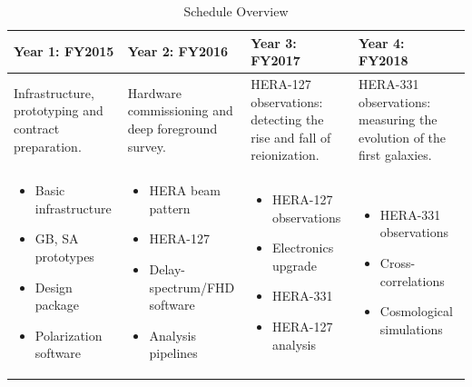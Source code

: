 \documentclass[preprint]{aastex}
\begin{document}
\begin{table}[h]
\centering
\caption{Schedule Overview}
\label{tab:scheduleSummary}
\begin{tabular}{| p{1.5in} | p{1.5in} | p{1.5in} | p{1.5in} |}\hline
\textbf{Year 1}:  FY2015   &  \textbf{Year 2}:  FY2016  &  \textbf{Year 3}:  FY2017 & \textbf{Year 4}:  FY2018 \\ \hline
\raggedright{Infrastructure, prototyping and contract preparation.} &
\raggedright{Hardware commissioning and deep foreground survey.} &
\raggedright{HERA-127 observations:  detecting the rise and fall of reionization.} &
HERA-331 observations:  measuring the evolution of the first galaxies. \\ \hline  %
\begin{itemize}[noitemsep,nolistsep,leftmargin=12pt]
\item Basic infrastructure
\item GB, SA prototypes
\item Design package
\item Polarization software
\end{itemize} &
\begin{itemize}[noitemsep,nolistsep,leftmargin=12pt]
\item HERA beam pattern
\item HERA-127
\item Delay-spectrum/FHD software
\item Analysis pipelines
\end{itemize} &
\begin{itemize}[noitemsep,nolistsep,leftmargin=12pt]
\item HERA-127 observations
\item Electronics upgrade
\item HERA-331
\item HERA-127 analysis
\end{itemize} &
\begin{itemize}[noitemsep,nolistsep,leftmargin=12pt]
\item HERA-331 observations
\item Cross-correlations
\item Cosmological simulations
\end{itemize} \\ \hline
\end{tabular}
\end{table}

\end{document}
